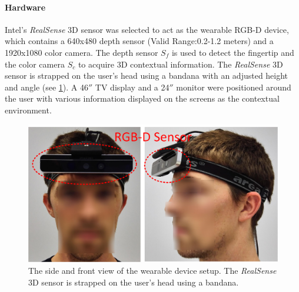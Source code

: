 \paragraph{Hardware}
Intel{\rq}s \textit{RealSense} 3D sensor  was selected to act as the wearable RGB-D device, which contains a 640x480 depth sensor (Valid Range:0.2-1.2 meters) and a 1920x1080 color camera. The depth sensor $S_f$ is used to detect the fingertip  and the color camera $S_c$ to acquire 3D contextual information. The \textit{RealSense} 3D sensor is strapped on the user{\rq}s head using a bandana with an adjusted height and angle (see \figurename{ \ref{fig:4-PAST:hardWare}}). 
A 46$''$ TV display and a 24$''$ monitor were positioned around the user with various information displayed on the screens as the contextual environment. 
\begin{figure}[htb]
	\centering
	\includegraphics[width = \linewidth]{figures/4-PAST/hardWare.png}
	\caption{The side and front view of the wearable device setup. The \textit{RealSense} 3D sensor is strapped on the user{\rq}s head using a bandana.}
	\label{fig:4-PAST:hardWare}
\end{figure}
